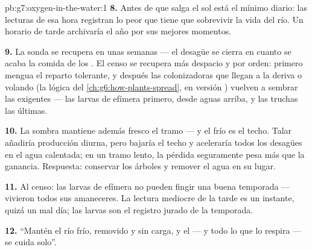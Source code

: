 \begin{solution}{pb:g7:oxygen-in-the-water:1}
\textbf{8.} Antes de que salga el sol está el mínimo diario: las
lecturas de esa hora registran lo peor que tiene que sobrevivir la vida
del río. Un horario de tarde archivaría el año por sus mejores momentos.

\textbf{9.} La sonda se recupera en unas semanas --- el desagüe se
cierra en cuanto se acaba la comida de los . El censo se
recupera más despacio y por orden: primero mengua el reparto tolerante,
y después las colonizadoras que llegan a la deriva o volando (la lógica
del \cref{ch:g6:how-plants-spread}, en versión ) vuelven a
sembrar las  exigentes --- las larvas de efímera primero, desde
aguas arriba, y las truchas las últimas.

\textbf{10.} La sombra mantiene además fresco el tramo --- y el frío es
el techo. Talar añadiría producción diurna, pero bajaría el techo y
aceleraría todos los desagües en el agua calentada; en un tramo lento,
la pérdida seguramente pesa más que la ganancia. Respuesta: conservar
los árboles y remover el agua en su lugar.

\textbf{11.} Al censo: las larvas de efímera no pueden fingir una buena
temporada --- vivieron todos sus amaneceres. La lectura mediocre de la
tarde es un instante, quizá un mal día; las larvas son el registro
jurado de la temporada.

\textbf{12.} ``Mantén el río frío, removido y sin carga, y el 
--- y todo lo que lo respira --- se cuida solo''.
\end{solution}

